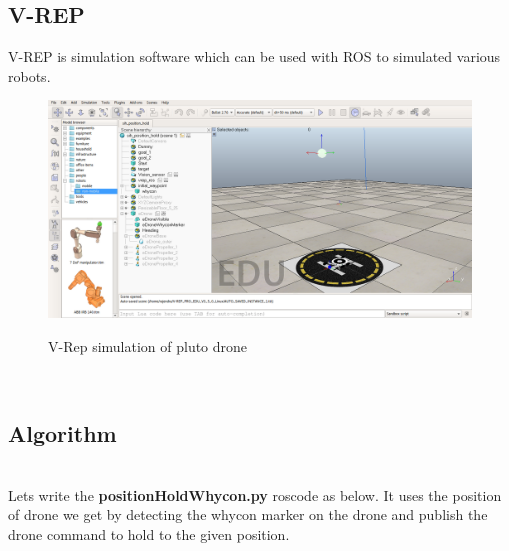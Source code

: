\subsection{V-REP}
V-REP is simulation software which can be used with ROS to simulated various robots.
\\
\newline \begin{figure}
    \centering
    \includegraphics[width=\textwidth]{images/vrep.png}
    \\
    \caption{V-Rep simulation of pluto drone}
\end{figure}
\\
\subsection{Algorithm}
\\
Lets write the \textbf{positionHoldWhycon.py} roscode as below. It uses the position of drone we get by detecting the whycon marker on the drone and publish the drone command to hold to the given position.

